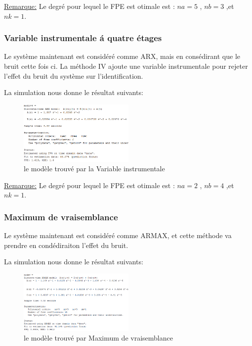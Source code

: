 \documentclass[twoside,twocolumn]{article}
\begin{document}
\underline{Remarque:}
Le degré pour lequel le FPE est otimale est : $na = 5$ , $nb=3$ ,et $nk=1$. 

\subsubsection{Variable instrumentale á quatre étages}
Le système maintenant est considéré comme ARX, mais en consédirant que le bruit cette fois ci. La méthode IV ajoute une variable instrumentale pour rejeter l'effet du bruit du système sur l'identification.

\label{matlab}

La simulation nous donne le résultat suivants:
\begin{figure}[H]
\centering
\includegraphics[width=0.5\textwidth]{Images/6.png}
\caption{ le modèle trouvé par la Variable instrumentale}
\end{figure}

\underline{Remarque:}
Le degré pour lequel le FPE est otimale est : $na = 2$ , $nb=4$ ,et $nk=1$. 

\subsubsection{Maximum de vraisemblance}
Le système maintenant est considéré comme ARMAX, et cette méthode va prendre en condédiraiton l'effet du bruit.
\label{matlab}

La simulation nous donne le résultat suivants:
\begin{figure}[H]
\centering
\includegraphics[width=0.5\textwidth]{Images/7.png}
\caption{ le modèle trouvé par Maximum de vraisemblance}
\end{figure}
\end{document}
